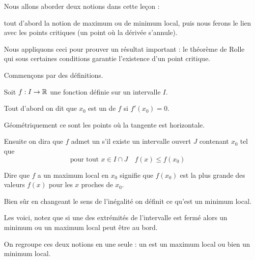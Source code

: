 







\debuttexte

\diapo


\change

Nous allons aborder deux notions dans cette leçon :

\change

tout d'abord la notion de maximum ou de minimum local,
puis nous ferons le lien avec les points critiques (un point où la dérivée s'annule).

\change

Nous appliquons ceci pour prouver un résultat important : le théorème de Rolle
qui sous certaines conditions garantie l'existence d'un point critique.


\diapo

Commençons par des définitions.

Soit $f : I \to \mathbb{R}$ une fonction définie sur un intervalle $I$.

Tout d'abord on dit que $x_0$ est un  de $f$ si $f'(x_0)=0$.

Géométriquement ce sont les points où la tangente est horizontale.

\change

Ensuite on dira que $f$ admet un   
s'il existe un intervalle ouvert $J$ contenant $x_0$  tel que 
$$\text{pour tout } x\in I \cap J \quad f(x) \le f(x_0)$$

\change

Dire que $f$ a un maximum local en $x_0$ signifie que $f(x_0)$ 
est la plus grande des valeurs $f(x)$ pour les $x$ proches de $x_0$.

\change

Bien sûr en changeant le sens de l'inégalité on définit ce qu'est un minimum local.

\change

Les voici, notez que si une des extrémités de l'intervalle est fermé alors un minimum ou un maximum local
peut être au bord.

\change

On regroupe ces deux notions en une seule : un  est un maximum 
local ou bien un minimum local.

